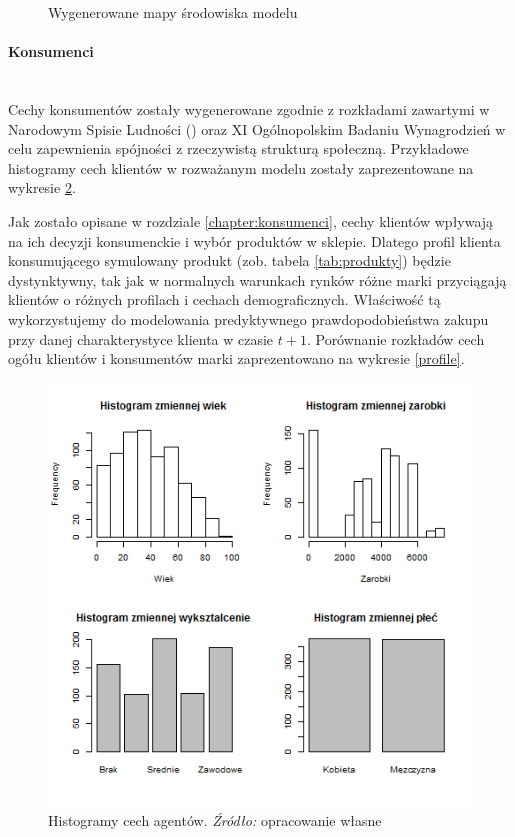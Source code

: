 \documentclass[polish, twoside, 12pt, a4paper]{article}
\theoremstyle{definition}
\theoremstyle{plain}
\theoremstyle{remark}
\begin{document}
\begin{figure}[hbt]
  \captionsetup{margin=10pt,font=small,labelfont=bf,width=.8\textwidth}

  \caption[Wygenerowane mapy środowiska modelu ]{Wygenerowane mapy środowiska modelu }\label{fig:generowanemapy}
\end{figure}

\paragraph{Konsumenci}\mbox{}\\
Cechy konsumentów zostały wygenerowane zgodnie z rozkładami zawartymi w Narodowym Spisie Ludności (\cite{GUS2011}) oraz XI Ogólnopolskim Badaniu Wynagrodzień \cite{Sedlak2013} w celu zapewnienia spójności z rzeczywistą strukturą społeczną. Przykładowe histogramy cech klientów w rozważanym modelu zostały zaprezentowane na wykresie \ref{ludnosc}. 

Jak zostało opisane w rozdziale \ref{chapter:konsumenci}, cechy klientów wpływają na ich decyzji konsumenckie i wybór produktów w sklepie. Dlatego profil klienta konsumującego symulowany produkt (zob. tabela \ref{tab:produkty}) będzie dystynktywny, tak jak w normalnych warunkach rynków różne marki przyciągają klientów o różnych profilach i cechach demograficznych. Właściwość tą wykorzystujemy do modelowania predyktywnego prawdopodobieństwa zakupu przy danej charakterystyce klienta w czasie $t+1$. Porównanie rozkładów cech ogółu klientów i konsumentów marki zaprezentowano na wykresie \ref{profile}.

\begin{figure}[hbt]
  \centering
    \includegraphics[width=\textwidth]{pictures/ludnosc.png}
  \captionsetup{margin=10pt,font=small,labelfont=bf,width=.8\textwidth}
  \caption[Histogramy cech agentów]{Histogramy cech agentów. \textit{Źródło:} opracowanie własne}\label{ludnosc}
\end{figure}
\end{document}
